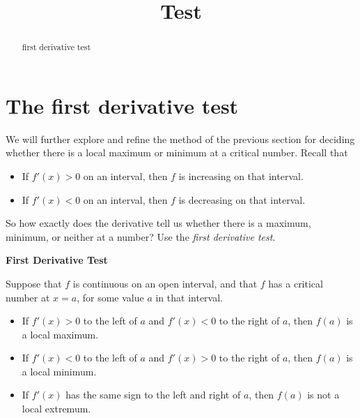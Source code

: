 \documentclass{ximera}
\title {Test}
\begin{document}
\begin{abstract}
first derivative test 
\end{abstract}
\maketitle





\section{The first derivative test}

We will further explore and refine the method of the previous section for deciding whether there is a
local maximum or minimum at a critical number.
 Recall that
\begin{itemize}
\item If $f'(x) >0$ on an interval, then $f$ is increasing on that interval.
\item If $f'(x) <0$ on an interval, then $f$ is decreasing on that interval.
\end{itemize}

So how exactly does the derivative tell us whether there is a maximum,
minimum, or neither at a number? Use the \textit{first derivative test}.

\begin{theorem}  \textbf{\textcolor{purple!85!blue}{First Derivative Test}} \label{T:fdt}



Suppose that $f$ is continuous on an open interval, and that $f$  has a critical number
at $x=a$, for some value $a$ in that interval.
\begin{itemize}
\item If $f'(x)>0$ to the left of $a$ and $f'(x)<0$ to the right of
  $a$, then $f(a)$ is a local maximum.
\item If $f'(x)<0$ to the left of $a$ and $f'(x)>0$ to the right of
  $a$, then $f(a)$ is a local minimum.
\item If $f'(x)$ has the same sign to the left and right of $a$,
  then $f(a)$ is not a local extremum.
\end{itemize}
\end{theorem}
\end{document}
